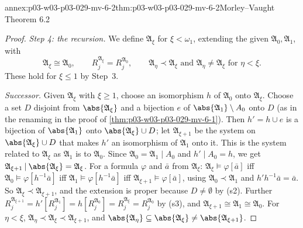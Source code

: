 \begin{annexitem}{annex:p03-w03-p03-029-mv-6-2}{thm:p03-w03-p03-029-mv-6-2}{Morley--Vaught Theorem 6.2}
\begin{proof}
\emph{Step 4: the recursion.} We define \(\mathfrak A_\xi\) for
\(\xi<\omega_1\), extending the given \(\mathfrak A_0,\mathfrak A_1\), with
\[
  \mathfrak A_\xi\cong\mathfrak A_0,\qquad
  R_j^{\mathfrak A_\xi}=R_j^{\mathfrak A_0},\qquad
  \mathfrak A_\eta\prec\mathfrak A_\xi\text{ and }\mathfrak A_\eta\neq\mathfrak
  A_\xi\text{ for }\eta<\xi .
\]
These hold for \(\xi\leq1\) by Step~3.

\emph{Successor.} Given \(\mathfrak A_\xi\) with \(\xi\geq1\), choose an
isomorphism \(h\) of \(\mathfrak A_0\) onto \(\mathfrak A_\xi\). Choose a set
\(D\) disjoint from \(\abs{\mathfrak A_\xi}\) and a bijection \(e\) of
\(\abs{\mathfrak A_1}\setminus A_0\) onto \(D\) (as in the renaming in the
proof of \cref{thm:p03-w03-p03-029-mv-6-1}). Then \(h'=h\cup e\) is a
bijection of \(\abs{\mathfrak A_1}\) onto \(\abs{\mathfrak A_\xi}\cup D\); let
\(\mathfrak A_{\xi+1}\) be the system on \(\abs{\mathfrak A_\xi}\cup D\) that
makes \(h'\) an isomorphism of \(\mathfrak A_1\) onto it. This is the
system related to \(\mathfrak A_\xi\) as \(\mathfrak A_1\) is to
\(\mathfrak A_0\). Since \(\mathfrak A_0=\mathfrak A_1\mathbin{|}A_0\) and
\(h'\mathbin{|}A_0=h\), we get \(\mathfrak A_{\xi+1}\mathbin{|}\abs{\mathfrak
A_\xi}=\mathfrak A_\xi\). For a formula \(\varphi\) and \(\bar a\) from
\(\mathfrak A_\xi\): \(\mathfrak A_\xi\models\varphi[\bar a]\) iff
\(\mathfrak A_0\models\varphi[h^{-1}\bar a]\) iff \(\mathfrak
A_1\models\varphi[h^{-1}\bar a]\) iff \(\mathfrak
A_{\xi+1}\models\varphi[\bar a]\), using \(\mathfrak A_0\prec\mathfrak A_1\)
and \(h'h^{-1}\bar a=\bar a\). So \(\mathfrak A_\xi\prec\mathfrak A_{\xi+1}\),
and the extension is proper because \(D\neq\emptyset\) by (s2). Further
\(R_j^{\mathfrak A_{\xi+1}}=h'[R_j^{\mathfrak A_1}]=h[R_j^{\mathfrak
A_0}]=R_j^{\mathfrak A_\xi}=R_j^{\mathfrak A_0}\) by (s3), and
\(\mathfrak A_{\xi+1}\cong\mathfrak A_1\cong\mathfrak A_0\). For
\(\eta<\xi\), \(\mathfrak A_\eta\prec\mathfrak A_\xi\prec\mathfrak
A_{\xi+1}\), and \(\abs{\mathfrak A_\eta}\subseteq\abs{\mathfrak
A_\xi}\neq\abs{\mathfrak A_{\xi+1}}\).


\end{proof}
\end{annexitem}
